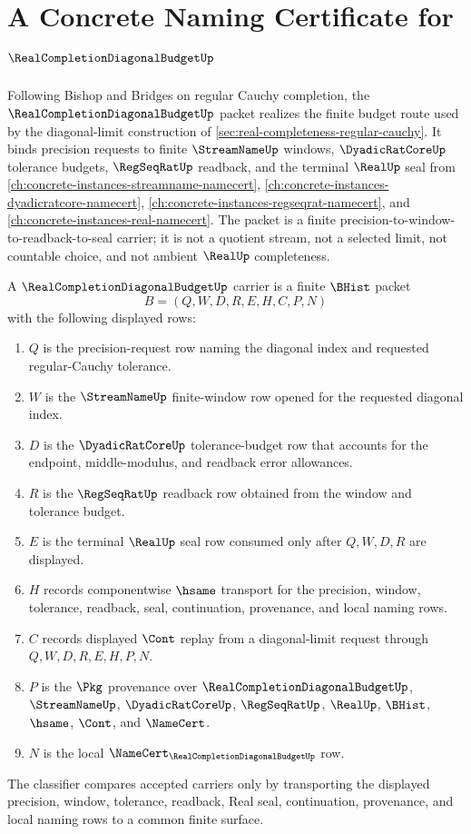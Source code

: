\chapter{A Concrete Naming Certificate for $\RealCompletionDiagonalBudgetUp$}
\label{ch:concrete-instances-real-completion-diagonal-budget-namecert}

Following Bishop and Bridges on regular Cauchy completion, the
$\RealCompletionDiagonalBudgetUp$ packet realizes the finite budget route used
by the diagonal-limit construction of
\autoref{sec:real-completeness-regular-cauchy}. It binds precision requests to
finite $\StreamNameUp$ windows, $\DyadicRatCoreUp$ tolerance budgets,
$\RegSeqRatUp$ readback, and the terminal $\RealUp$ seal from
\autoref{ch:concrete-instances-streamname-namecert},
\autoref{ch:concrete-instances-dyadicratcore-namecert},
\autoref{ch:concrete-instances-regseqrat-namecert}, and
\autoref{ch:concrete-instances-real-namecert}. The packet is a finite
precision-to-window-to-readback-to-seal carrier; it is not a quotient stream,
not a selected limit, not countable choice, and not ambient $\RealUp$
completeness.

\begin{definition}
\label{def:real-completion-diagonal-budget-carrier}
A $\RealCompletionDiagonalBudgetUp$ carrier is a finite $\BHist$ packet
$$
B=(Q,W,D,R,E,H,C,P,N)
$$
with the following displayed rows:
\begin{enumerate}
\item $Q$ is the precision-request row naming the diagonal index and requested
regular-Cauchy tolerance.
\item $W$ is the $\StreamNameUp$ finite-window row opened for the requested
diagonal index.
\item $D$ is the $\DyadicRatCoreUp$ tolerance-budget row that accounts for the
endpoint, middle-modulus, and readback error allowances.
\item $R$ is the $\RegSeqRatUp$ readback row obtained from the window and
tolerance budget.
\item $E$ is the terminal $\RealUp$ seal row consumed only after $Q,W,D,R$ are
displayed.
\item $H$ records componentwise $\hsame$ transport for the precision, window,
tolerance, readback, seal, continuation, provenance, and local naming rows.
\item $C$ records displayed $\Cont$ replay from a diagonal-limit request
through $Q,W,D,R,E,H,P,N$.
\item $P$ is the $\Pkg$ provenance over $\RealCompletionDiagonalBudgetUp$,
$\StreamNameUp$, $\DyadicRatCoreUp$, $\RegSeqRatUp$, $\RealUp$, $\BHist$,
$\hsame$, $\Cont$, and $\NameCert$.
\item $N$ is the local $\NameCert_{\RealCompletionDiagonalBudgetUp}$ row.
\end{enumerate}
The classifier compares accepted carriers only by transporting the displayed
precision, window, tolerance, readback, Real seal, continuation, provenance,
and local naming rows to a common finite surface.
\end{definition}

